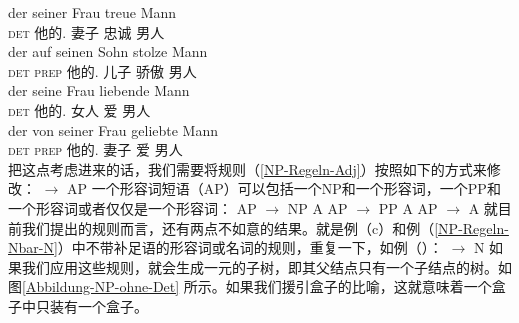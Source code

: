\eal
\ex 
\gll der seiner Frau treue Mann\\
	 \textsc{det} 他的.\dat{} 妻子 忠诚 男人\\
\ex 
\gll der auf seinen Sohn stolze Mann\\
	 \textsc{det} \textsc{prep} 他的.\acc{} 儿子 骄傲 男人\\
\ex 
\gll der seine Frau liebende Mann\\
	 \textsc{det} 他的.\acc{} 女人 爱 男人\\
\ex 
\gll der von seiner Frau geliebte Mann\\
     \textsc{det} \textsc{prep} 他的.\dat{} 妻子 爱 男人\\
\zl
把这点考虑进来的话，我们需要将规则（\ref{NP-Regeln-Adj}）按照如下的方式来修改：
\ea
\label{NP-Regeln-AP} 
\nbar $\to$ AP \nbar
\z
一个形容词短语（AP）可以包括一个NP和一个形容词，一个PP和一个形容词或者仅仅是一个形容词：
\eal
\ex AP $\to$ NP A
\ex AP $\to$ PP A
\ex AP $\to$ A
\zl
就目前我们提出的规则而言，还有两点不如意的结果。就是例（c）和例（\ref{NP-Regeln-Nbar-N}）中不带补足语的形容词或名词的规则，重复一下，如例（）：
\ea
\nbar $\to$ N
\z
如果我们应用这些规则，就会生成一元的子树，即其父结点只有一个子结点的树。如图\ref{Abbildung-NP-ohne-Det} 所示。如果我们援引盒子的比喻，这就意味着一个盒子中只装有一个盒子。

